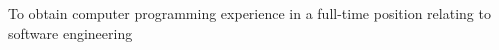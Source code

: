 
To obtain computer programming experience in a full-time position relating to software engineering
